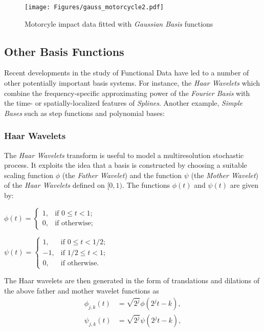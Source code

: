 \begin{figure}[h]
  \centering
    \texttt{[image: Figures/gauss\_motorcycle2.pdf]}
  \caption[Motorcyle impact data fitted with  \textit{Gaussian Basis} functions]{Motorcyle impact data fitted with \textit{Gaussian Basis} functions}
  \label{fig:FDA4}
\end{figure}


\subsection{Other Basis Functions}

Recent developments in the study of Functional Data have led to a number of other potentially important basis systems. For instance, the \textit{Haar Wavelets} which combine the frequency-specific approximating power of the \textit{Fourier Basis} with the time- or spatially-localized features of \textit{Splines}. Another example, \textit{Simple Bases} such as step functions and polynomial bases:
\subsubsection*{Haar Wavelets}
The \textit{Haar Wavelets} transform is useful to model a multiresolution stochastic process. It exploits the idea that a basis is constructed by choosing a suitable scaling function $\phi$ (the \textit{Father Wavelet}) and the function $\psi$ (the \textit{Mother Wavelet}) of the \textit{Haar Wavelets} defined on $[0,1)$. The functions $\phi(t)$ and $\psi(t)$ are given by:
\begin{center}
$\phi(t) =
    \begin{cases}
            1, &         \text{if } 0 \leq t < 1;\\
            0, &         \text{if otherwise};
    \end{cases}$
\end{center}

\begin{center}
$\psi(t) =
    \begin{cases}
            1, &         \text{if } 0 \leq t < 1/2;\\
            -1, &         \text{if } 1/2 \leq t < 1;\\
            0, &         \text{if otherwise}.
    \end{cases}$
\end{center}
The Haar wavelets are then generated in the form of translations and dilations of the above father and mother wavelet functions as
\begin{align}
\phi_{j,k}(t) &= \sqrt{2^j}\phi(2^j t - k), \nonumber \\
\psi_{j,k}(t) &= \sqrt{2^j}\psi(2^j t - k), \nonumber
\end{align}

